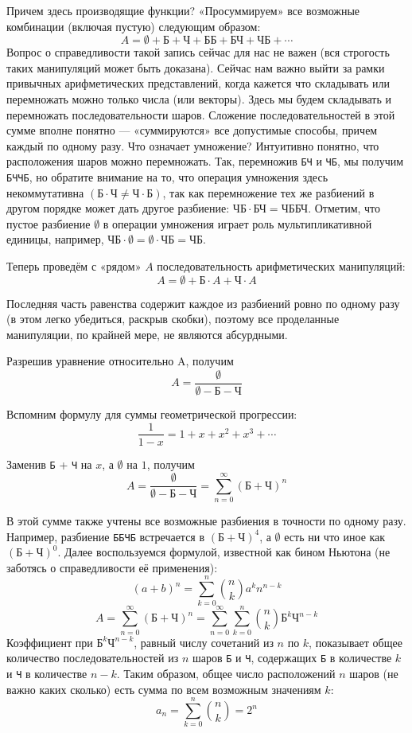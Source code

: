 \documentclass[12pt, letterpaper]{extarticle}
\begin{document}
Причем здесь производящие функции? «Просуммируем» все возможные комбинации (включая пустую) следующим образом:
\[A=\emptyset+\texttt{Б}+\texttt{Ч}+\texttt{ББ}+\texttt{БЧ}+\texttt{ЧБ}+\cdots\]
Вопрос о справедливости такой запись сейчас для нас не важен (вся строгость таких манипуляций может быть доказана). Сейчас нам важно выйти за рамки привычных арифметических представлений, когда кажется что складывать или перемножать можно только числа (или векторы). Здесь мы будем складывать и перемножать последовательности шаров. Сложение последовательностей в этой сумме вполне понятно — «суммируются» все допустимые способы, причем каждый по одному разу. Что означает умножение? Интуитивно понятно, что расположения шаров можно перемножать. Так, перемножив \texttt{БЧ} и \texttt{ЧБ}, мы получим \texttt{БЧЧБ}, но обратите внимание на то, что операция умножения здесь некоммутативна $(\texttt{Б}\cdot\texttt{Ч} \neq \texttt{Ч}\cdot\texttt{Б})$, так как перемножение тех же разбиений в другом порядке может дать другое разбиение: $\texttt{ЧБ}\cdot\texttt{БЧ}=\texttt{ЧББЧ}$. Отметим, что пустое разбиение $\emptyset$ в операции умножения играет роль мультипликативной единицы, например, $\texttt{ЧБ}\cdot\emptyset=\emptyset\cdot\texttt{ЧБ}=\texttt{ЧБ}$.

Теперь проведём с «рядом» $A$ последовательность арифметических манипуляций:
\[A=\emptyset+\texttt{Б}\cdot A+\texttt{Ч}\cdot A\]

Последняя часть равенства содержит каждое из разбиений ровно по одному разу (в этом легко убедиться, раскрыв скобки), поэтому все проделанные манипуляции, по крайней мере, не являются абсурдными.

Разрешив уравнение относительно A, получим
\[A=\frac{\emptyset}{\emptyset-\texttt{Б}-\texttt{Ч}}\]

Вспомним формулу для суммы геометрической прогрессии:
\[\frac{1}{1-x}=1+x+x^2+x^3+\cdots\]

Заменив \texttt{Б} + \texttt{Ч} на $x$, а $\emptyset$ на $1$, получим
\[A=\frac{\emptyset}{\emptyset-\texttt{Б}-\texttt{Ч}}=\sum_{n=0}^{\infty}(\texttt{Б}+\texttt{Ч})^n\]

В этой сумме также учтены все возможные разбиения в точности по одному разу. Например, разбиение \texttt{ББЧБ} встречается в $(\texttt{Б}+\texttt{Ч})^4$, а $\emptyset$ есть ни что иное как $(\texttt{Б}+\texttt{Ч})^0$. Далее воспользуемся формулой, известной как бином Ньютона (не заботясь о справедливости её применения):
\[(a+b)^n=\sum_{k=0}^{n}\binom{n}{k}a^kn^{n-k}\]
\[A=\sum_{n=0}^{\infty}(\texttt{Б}+\texttt{Ч})^n=\sum_{n=0}^{\infty}\sum_{k=0}^{n}\binom{n}{k}\texttt{Б}^k\texttt{Ч}^{n-k}\]
Коэффициент при $\texttt{Б}^k\texttt{Ч}^{n-k}$, равный числу сочетаний из $n$ по $k$, показывает общее количество последовательностей из $n$ шаров \texttt{Б} и \texttt{Ч}, содержащих \texttt{Б} в количестве $k$ и \texttt{Ч} в количестве $n-k$. Таким образом, общее число расположений $n$ шаров (не важно каких сколько) есть сумма по всем возможным значениям $k$:
\[a_n=\sum_{k=0}^{n}\binom{n}{k}=2^n\]
\end{document}
